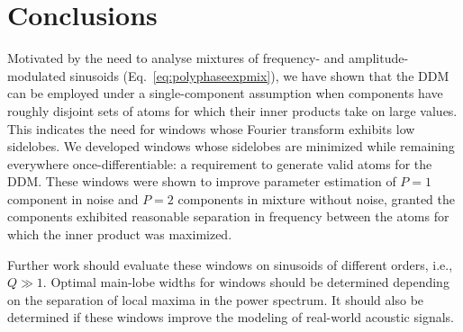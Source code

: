 \documentclass[twoside,a4paper]{article}
\begin{document}
\section{Conclusions}

Motivated by the need to analyse mixtures of frequency- and
am\-pli\-tude-mod\-u\-lat\-ed
sinusoids (Eq.~\ref{eq:polyphaseexpmix}), we have shown that the DDM can be
employed under a single-component
assumption when components have roughly disjoint sets of atoms for which their
inner products take on large values. This indicates the need for windows whose
Fourier transform exhibits low sidelobes. We developed windows whose sidelobes
are minimized while remaining everywhere once-differentiable: a requirement to
generate valid atoms for the DDM. These windows were shown to improve parameter
estimation of $P=1$ component in noise and $P=2$ components in mixture without
noise, granted the components
exhibited reasonable separation in frequency between the atoms for which the
inner product was maximized.

Further work should evaluate these windows on sinusoids of different orders,
i.e., $Q \gg 1$. Optimal main-lobe widths for windows should be determined
depending on the separation of local maxima in the power spectrum. It should
also be determined if these windows improve the modeling of real-world acoustic
signals.




\end{document}

